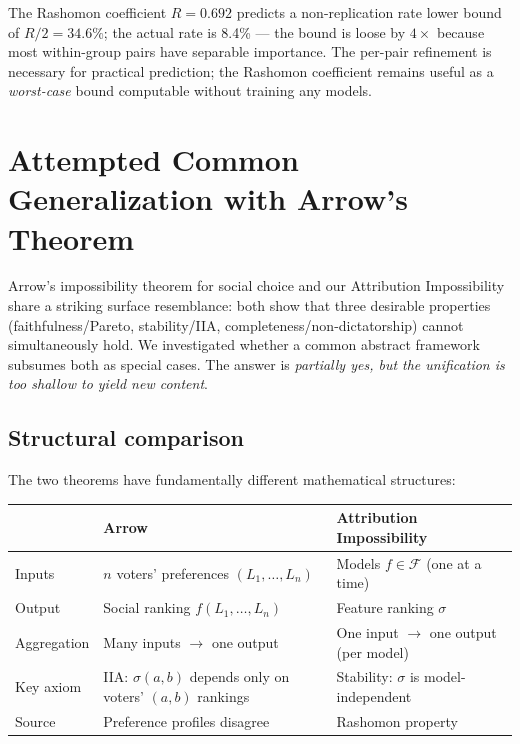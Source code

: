 \documentclass{article}
\begin{document}
The Rashomon coefficient $R = 0.692$ predicts a non-replication
rate lower bound of $R/2 = 34.6\%$; the actual rate is 8.4\%
--- the bound is loose by $4\times$ because most within-group pairs
have separable importance. The per-pair refinement is necessary for
practical prediction; the Rashomon coefficient remains useful as a
\emph{worst-case} bound computable without training any models.

\section{Attempted Common Generalization with Arrow's Theorem}
\label{sec:arrow-generalization}

Arrow's impossibility theorem for social choice and our Attribution
Impossibility share a striking surface resemblance:
both show that three desirable properties (faithfulness/Pareto,
stability/IIA, completeness/non-dictatorship) cannot simultaneously
hold. We investigated whether a common abstract framework subsumes both
as special cases. The answer is \emph{partially yes, but the unification
is too shallow to yield new content}.

\subsection{Structural comparison}

The two theorems have fundamentally different mathematical structures:

\begin{center}
\small
\begin{tabular}{@{}lp{5cm}p{5.5cm}@{}}
\toprule
& \textbf{Arrow} & \textbf{Attribution Impossibility} \\
\midrule
Inputs & $n$ voters' preferences $(L_1, \ldots, L_n)$ & Models $f \in \mathcal{F}$ (one at a time) \\
Output & Social ranking $f(L_1, \ldots, L_n)$ & Feature ranking $\sigma$ \\
Aggregation & Many inputs $\to$ one output & One input $\to$ one output (per model) \\
Key axiom & IIA: $\sigma(a,b)$ depends only on voters' $(a,b)$ rankings & Stability: $\sigma$ is model-independent \\
Source & Preference profiles disagree & Rashomon property \\
\bottomrule
\end{tabular}
\end{center}
\end{document}
